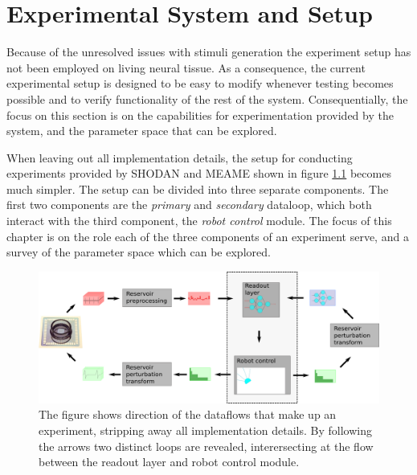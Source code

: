 \chapter{Experimental System and Setup}
Because of the unresolved issues with stimuli generation the experiment setup has not been
employed on living neural tissue.
As a consequence, the current experimental setup is designed to be easy to
modify whenever testing becomes possible and to verify functionality of the rest
of the system.
Consequentially, the focus on this section is on the capabilities for experimentation
provided by the system, and the parameter space that can be explored.\par
%
When leaving out all implementation details, the setup for conducting experiments
provided by SHODAN and MEAME shown in figure \ref{figExperimentLoop} becomes much simpler.
The setup can be divided into three separate components.
The first two components are the \emph{primary} and \emph{secondary} dataloop,
which both interact with the third component, the \emph{robot control} module.
The focus of this chapter is on the role each of the three components of an
experiment serve, and a survey of the parameter space which can be explored. 
\begin{figure}[h!]
  \centering
  \includegraphics[width=1\textwidth]{fig/experimentLoopFull.png}
  \caption{
    The figure shows direction of the dataflows that make up an experiment,
    stripping away all implementation details.
    By following the arrows two distinct loops are revealed, interersecting at
    the flow between the readout layer and robot control module.
  }
  \label{figExperimentLoop}
\end{figure}
%
